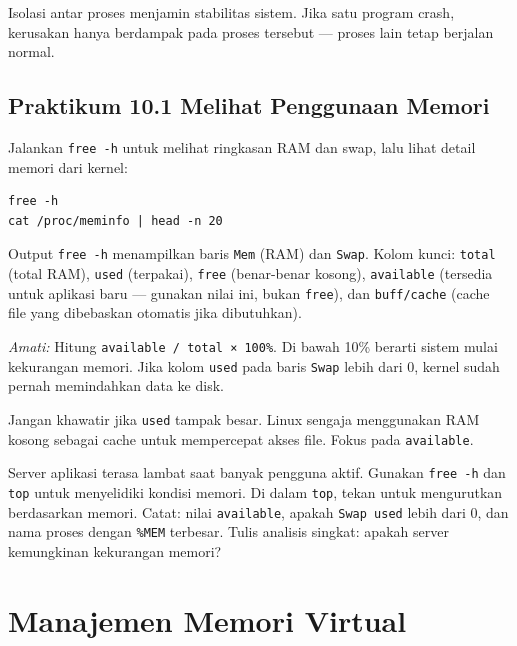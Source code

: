 \begin{notebox}
Isolasi antar proses menjamin stabilitas sistem. Jika satu program crash, kerusakan
hanya berdampak pada proses tersebut --- proses lain tetap berjalan normal.
\end{notebox}

\subsection*{Praktikum 10.1 Melihat Penggunaan Memori}

Jalankan \texttt{free -h} untuk melihat ringkasan RAM dan swap, lalu lihat detail
memori dari kernel:

\begin{lstlisting}[caption={Ringkasan dan detail memori}]
free -h
cat /proc/meminfo | head -n 20
\end{lstlisting}

Output \texttt{free -h} menampilkan baris \texttt{Mem} (RAM) dan \texttt{Swap}.
Kolom kunci: \texttt{total} (total RAM), \texttt{used} (terpakai), \texttt{free}
(benar-benar kosong), \texttt{available} (tersedia untuk aplikasi baru --- gunakan
nilai ini, bukan \texttt{free}), dan \texttt{buff/cache} (cache file yang dibebaskan
otomatis jika dibutuhkan).

\textit{Amati:} Hitung \texttt{available / total × 100\%}. Di bawah 10\% berarti
sistem mulai kekurangan memori. Jika kolom \texttt{used} pada baris \texttt{Swap}
lebih dari 0, kernel sudah pernah memindahkan data ke disk.

\begin{tipbox}
Jangan khawatir jika \texttt{used} tampak besar. Linux sengaja menggunakan RAM
kosong sebagai cache untuk mempercepat akses file. Fokus pada \texttt{available}.
\end{tipbox}

\begin{challengebox}
Server aplikasi terasa lambat saat banyak pengguna aktif. Gunakan \texttt{free -h}
dan \texttt{top} untuk menyelidiki kondisi memori. Di dalam \texttt{top}, tekan
 untuk mengurutkan berdasarkan memori. Catat: nilai \texttt{available},
apakah \texttt{Swap used} lebih dari 0, dan nama proses dengan \texttt{\%MEM}
terbesar. Tulis analisis singkat: apakah server kemungkinan kekurangan memori?
\end{challengebox}

\section{Manajemen Memori Virtual}

